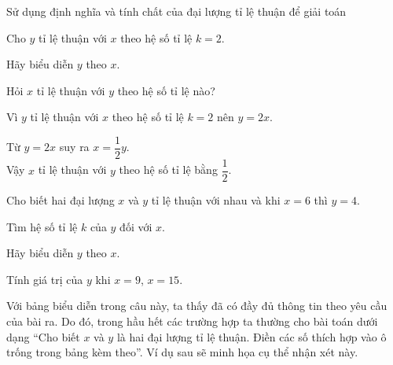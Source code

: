 \begin{dang}{Sử dụng định nghĩa và tính chất của đại lượng tỉ lệ thuận để giải toán}
 
\end{dang}

\begin{vd}%
 Cho $y$ tỉ lệ thuận với $x$ theo hệ số tỉ lệ $k=2$.
 \begin{listEX}
  \item Hãy biểu diễn $y$ theo $x$.
  \item Hỏi $x$ tỉ lệ thuận với $y$ theo hệ số tỉ lệ nào?
 \end{listEX}
 \loigiai
  {
  \begin{listEX}
   \item Vì $y$ tỉ lệ thuận với $x$ theo hệ số tỉ lệ $k=2$ nên $y=2x$.
   \item Từ $y=2x$ suy ra $x=\dfrac{1}{2}y$.\\
   Vậy $x$ tỉ lệ thuận với $y$ theo hệ số tỉ lệ bằng $\dfrac{1}{2}$.
  \end{listEX}
  }
\end{vd}

\begin{vd}%
 Cho biết hai đại lượng $x$ và $y$ tỉ lệ thuận với nhau và khi $x=6$ thì $y=4$.
 \begin{enumEX}{2}
  \item Tìm hệ số tỉ lệ $k$ của $y$ đối với $x$.
  \item Hãy biểu diễn $y$ theo $x$.
  \item Tính giá trị của $y$ khi $x=9$, $x=15$.
 \end{enumEX}
 \loigiai
  {
  \begin{note}
   Với bảng biểu diễn trong câu này, ta thấy đã có đầy đủ thông tin theo yêu cầu của bài ra. Do đó, trong hầu hết các trường hợp ta thường cho bài toán dưới dạng ``Cho biết $x$ và $y$ là hai đại lượng tỉ lệ thuận. Điền các số thích hợp vào ô trống trong bảng kèm theo''. Ví dụ sau sẽ minh họa cụ thể nhận xét này.
  \end{note}
  }
\end{vd}

